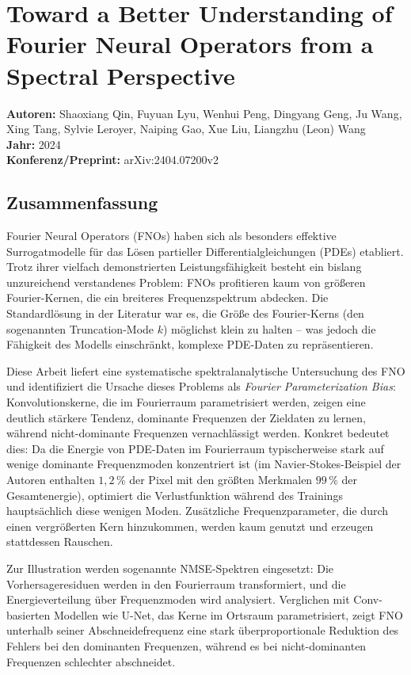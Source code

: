 \documentclass[a4paper,12pt]{article}
\begin{document}
\section*{Toward a Better Understanding of Fourier Neural Operators from a Spectral Perspective}

\textbf{Autoren:} Shaoxiang Qin, Fuyuan Lyu, Wenhui Peng, Dingyang Geng, Ju Wang, Xing Tang,
Sylvie Leroyer, Naiping Gao, Xue Liu, Liangzhu (Leon) Wang \\
\textbf{Jahr:} 2024 \\
\textbf{Konferenz/Preprint:} arXiv:2404.07200v2

\subsection*{Zusammenfassung}

Fourier Neural Operators (FNOs) haben sich als besonders effektive Surrogatmodelle f\"ur das
L\"osen partieller Differentialgleichungen (PDEs) etabliert. Trotz ihrer vielfach demonstrierten
Leistungsf\"ahigkeit besteht ein bislang unzureichend verstandenes Problem: FNOs profitieren
kaum von gr\"o\ss{}eren Fourier-Kernen, die ein breiteres Frequenzspektrum abdecken. Die
Standardl\"osung in der Literatur war es, die Gr\"o\ss{}e des Fourier-Kerns (den sogenannten
Truncation-Mode $k$) m\"oglichst klein zu halten -- was jedoch die F\"ahigkeit des Modells
einschr\"ankt, komplexe PDE-Daten zu repr\"asentieren.

Diese Arbeit liefert eine systematische spektralanalytische Untersuchung des FNO und identifiziert
die Ursache dieses Problems als \textit{Fourier Parameterization Bias}: Konvolutionskerne, die
im Fourierraum parametrisiert werden, zeigen eine deutlich st\"arkere Tendenz, dominante
Frequenzen der Zieldaten zu lernen, w\"ahrend nicht-dominante Frequenzen vernachl\"assigt
werden. Konkret bedeutet dies: Da die Energie von PDE-Daten im Fourierraum typischerweise
stark auf wenige dominante Frequenzmoden konzentriert ist (im Navier-Stokes-Beispiel der
Autoren enthalten $1{,}2\,\%$ der Pixel mit den gr\"o\ss{}ten Merkmalen $99\,\%$ der Gesamtenergie),
optimiert die Verlustfunktion w\"ahrend des Trainings haupts\"achlich diese wenigen Moden.
Zus\"atzliche Frequenzparameter, die durch einen vergr\"o\ss{}erten Kern hinzukommen, werden
kaum genutzt und erzeugen stattdessen Rauschen.

Zur Illustration werden sogenannte NMSE-Spektren eingesetzt: Die Vorhersageresiduen werden
in den Fourierraum transformiert, und die Energieverteilung \"uber Frequenzmoden wird
analysiert. Verglichen mit Conv-basierten Modellen wie U-Net, das Kerne im Ortsraum
parametrisiert, zeigt FNO unterhalb seiner Abschneidefrequenz eine stark \"uberproportionale
Reduktion des Fehlers bei den dominanten Frequenzen, w\"ahrend es bei nicht-dominanten
Frequenzen schlechter abschneidet.
\end{document}
